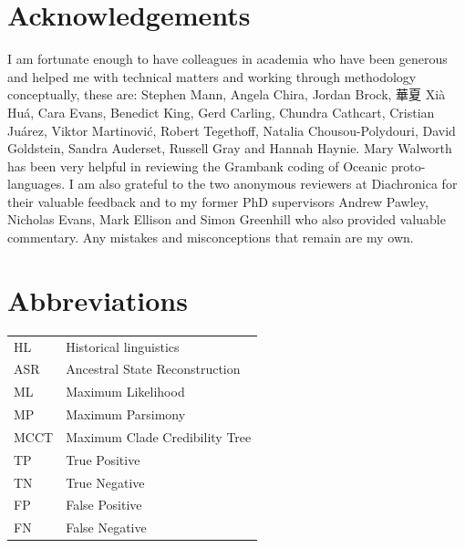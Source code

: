 \documentclass[12pt,letterpaper]{article}
\begin{document}





\FloatBarrier


\newpage
\section*{Acknowledgements}
I am fortunate enough to have colleagues in academia who have been generous and helped me with technical matters and working through methodology conceptually, these are: Stephen Mann, Angela Chira, Jordan Brock,  華夏 Xià Huá, Cara Evans, Benedict King, Gerd Carling, Chundra Cathcart, Cristian Juárez, Viktor Martinović, Robert Tegethoff, Natalia Chousou-Polydouri, David Goldstein, Sandra Auderset, Russell Gray and Hannah Haynie. Mary Walworth has been very helpful in reviewing the Grambank coding of Oceanic proto-languages. I am also grateful to the two anonymous reviewers at Diachronica for their valuable feedback and to my former PhD supervisors Andrew Pawley, Nicholas Evans, Mark Ellison and Simon Greenhill who also provided valuable commentary. Any mistakes and misconceptions that remain are my own.



\section*{Abbreviations}
\begin{tabular}{|p{3cm}| p{4.5cm}| }
HL & Historical linguistics\\
ASR & Ancestral State Reconstruction\\
ML & Maximum Likelihood \\
MP &Maximum Parsimony \\
MCCT & Maximum Clade Credibility Tree \\
TP & True Positive \\
TN & True Negative\\
FP & False Positive \\
FN & False Negative \\
\end{tabular}
\end{document}

